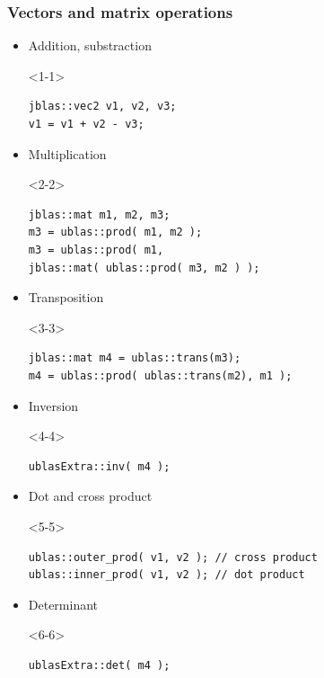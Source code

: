 \documentclass[pdf]{beamer}
\begin{document}
\begin{frame}[fragile]
  \frametitle{Vectors and matrix operations}
  \begin{itemize}
   \item<1-> Addition, substraction
    \begin{onlyenv}<1-1>
      \begin{lstlisting}
jblas::vec2 v1, v2, v3;
v1 = v1 + v2 - v3;
      \end{lstlisting}
    \end{onlyenv}
   \item<2-> Multiplication
    \begin{onlyenv}<2-2>
      \begin{lstlisting}
jblas::mat m1, m2, m3;
m3 = ublas::prod( m1, m2 );
m3 = ublas::prod( m1,
jblas::mat( ublas::prod( m3, m2 ) );
      \end{lstlisting}
    \end{onlyenv}
    \item<3-> Transposition
    \begin{onlyenv}<3-3>
      \begin{lstlisting}
jblas::mat m4 = ublas::trans(m3);
m4 = ublas::prod( ublas::trans(m2), m1 );
      \end{lstlisting}
    \end{onlyenv}
    \item<4-> Inversion
    \begin{onlyenv}<4-4>
      \begin{lstlisting}
ublasExtra::inv( m4 );
      \end{lstlisting}
    \end{onlyenv}
    \item<5-> Dot and cross product
    \begin{onlyenv}<5-5>
      \begin{lstlisting}
ublas::outer_prod( v1, v2 ); // cross product
ublas::inner_prod( v1, v2 ); // dot product
      \end{lstlisting}
    \end{onlyenv}
    \item<6-> Determinant
    \begin{onlyenv}<6-6>
      \begin{lstlisting}
ublasExtra::det( m4 );
      \end{lstlisting}
    \end{onlyenv}
  \end{itemize}
\end{frame}
\end{document}
